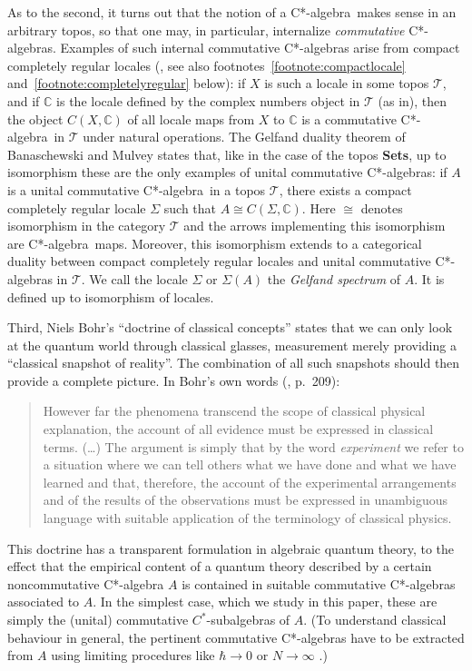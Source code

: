 \documentclass[11pt]{article}
\newcommand{\Sets}{\mbox{\textbf{Sets}}}
\newcommand{\ca}{C*-algebra} \newcommand{\jba}{JB-algebra}
\newcommand{\raw}{\rightarrow} \newcommand{\rat}{\mapsto}
\newcommand{\Sg}{\Sigma} \newcommand{\ta}{\tau} \newcommand{\ph}{\phi}
\newcommand{\CT}{{\mathcal T}} \newcommand{\CV}{{\mathcal V}}
\newcommand{\C}{{\mathbb C}} \newcommand{\D}{{\mathbb D}}
\begin{document}
As to the second, it turns out that the
notion of a \ca\ makes sense in an arbitrary topos,
so that one may, in particular, internalize
{\it commutative}  \ca s. Examples of such internal commutative \ca s
arise from compact completely regular locales
(\cite{banaschewskimulvey06, johnstone82}, see also
footnotes~\ref{footnote:compactlocale} and~\ref{footnote:completelyregular}
below):
 if $X$ is such a locale in some topos $\CT$, and if
$\C$ is the locale defined by the complex numbers object in $\CT$ (as
in\cite{banaschewskimulvey06}), then the
object $C(X,\C)$ of all locale maps from
$X$ to $\C$ is a commutative \ca\ in $\CT$ under natural operations.
The Gelfand duality theorem of Banaschewski and Mulvey
\cite{banaschewskimulvey06} states that, like in the case of the topos \Sets, up
to isomorphism these are the only examples of unital
 commutative \ca s:
 if $A$ is a unital commutative \ca\ in a topos $\CT$,
 there exists a  compact completely  regular
 locale $\Sg$ such that
$A\cong C(\Sg,\C)$. Here $\cong$ denotes isomorphism in the category $\CT$ and
the arrows implementing this isomorphism are \ca\ maps.
 Moreover,  this isomorphism extends to a categorical duality
 between  compact completely  regular locales and unital
 commutative \ca s in $\CT$.  We call the locale $\Sg$ or $\Sg(A)$
the {\it Gelfand spectrum} of $A$. It is defined up to isomorphism of locales.

Third, Niels Bohr's ``doctrine of classical concepts''  states that we can only
look at the quantum world through classical glasses, measurement merely
providing a
``classical snapshot of reality''.  The combination of all such
snapshots should then provide a complete picture. In Bohr's own words
(\cite{bohr49}, p.\ 209):
\begin{quote}
However far the phenomena transcend the scope of classical physical
explanation, the account of all evidence must be expressed in
classical terms. (\ldots) The argument is simply that by the word {\it
experiment} we refer to a situation where we can tell others what we
have done and what we have learned and that, therefore, the account of
the experimental arrangements and of the results of the observations
must be expressed in unambiguous language with suitable application of
the terminology of classical physics.
\end{quote}
This doctrine  has a transparent formulation in algebraic quantum
theory, to the effect that the empirical content of a quantum theory
described by a certain noncommutative C*-algebra $A$ is contained in
suitable commutative C*-algebras associated to $A$. In the simplest
case, which we study in this paper, these are simply the (unital)
commutative $C^*$-subalgebras of $A$. (To understand classical
behaviour in general, the  pertinent commutative C*-algebras have to
be extracted from $A$ using  limiting procedures like $\hbar\raw 0$ or
$N\raw\infty$ \cite{landsman07}.)
\end{document}
